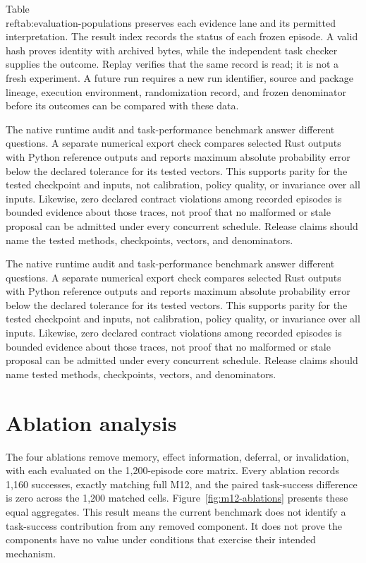 \documentclass[11pt]{article}
\begin{document}
Table~\\ref{tab:evaluation-populations} preserves each evidence lane and its permitted interpretation. The result index records the status of each frozen episode. A valid hash proves identity with archived bytes, while the independent task checker supplies the outcome. Replay verifies that the same record is read; it is not a fresh experiment. A future run requires a new run identifier, source and package lineage, execution environment, randomization record, and frozen denominator before its outcomes can be compared with these data.

The native runtime audit and task-performance benchmark answer different questions. A separate numerical export check compares selected Rust outputs with Python reference outputs and reports maximum absolute probability error below the declared tolerance for its tested vectors. This supports parity for the tested checkpoint and inputs, not calibration, policy quality, or invariance over all inputs. Likewise, zero declared contract violations among recorded episodes is bounded evidence about those traces, not proof that no malformed or stale proposal can be admitted under every concurrent schedule. Release claims should name the tested methods, checkpoints, vectors, and denominators.

The native runtime audit and task-performance benchmark answer different questions. A separate numerical export check compares selected Rust outputs with Python reference outputs and reports maximum absolute probability error below the declared tolerance for its tested vectors. This supports parity for the tested checkpoint and inputs, not calibration, policy quality, or invariance over all inputs. Likewise, zero declared contract violations among recorded episodes is bounded evidence about those traces, not proof that no malformed or stale proposal can be admitted under every concurrent schedule. Release claims should name tested methods, checkpoints, vectors, and denominators.

\section{Ablation analysis}
The four ablations remove memory, effect information, deferral, or invalidation, with each evaluated on the 1,200-episode core matrix. Every ablation records 1,160 successes, exactly matching full M12, and the paired task-success difference is zero across the 1,200 matched cells. Figure~\ref{fig:m12-ablations} presents these equal aggregates. This result means the current benchmark does not identify a task-success contribution from any removed component. It does not prove the components have no value under conditions that exercise their intended mechanism.
\end{document}
